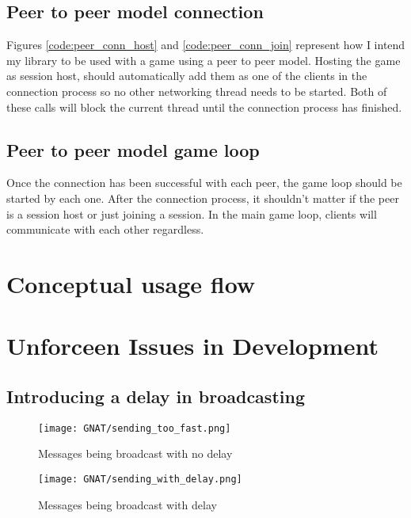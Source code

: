 


\newpage
\subsection{Peer to peer model connection}
Figures \ref{code:peer_conn_host} and \ref{code:peer_conn_join} represent how I intend my library to be used with a game using a peer to peer model. Hosting the game as session host, should automatically add them as one of the clients in the connection process so no other networking thread needs to be started. Both of these calls will block the current thread until the connection process has finished.




\newpage
\subsection{Peer to peer model game loop}
Once the connection has been successful with each peer, the game loop should be started by each one. After the connection process, it shouldn't matter if the peer is a session host or just joining a session. In the main game loop, clients will communicate with each other regardless.





\newpage
\section{Conceptual usage flow}



\section{Unforceen Issues in Development}
\subsection{Introducing a delay in broadcasting}
\newpage
\vfill
\begin{figure}[!h]
  \centering
  \texttt{[image: GNAT/sending\_too\_fast.png]}
  \caption{Messages being broadcast with no delay}
  \label{fig:broadcast_too_fast}
\end{figure}

\begin{figure}[!h]
  \centering
  \texttt{[image: GNAT/sending\_with\_delay.png]}
  \caption{Messages being broadcast with delay}
  \label{fig:broadcast_with_delay}
\end{figure}
\vfill
\newpage
